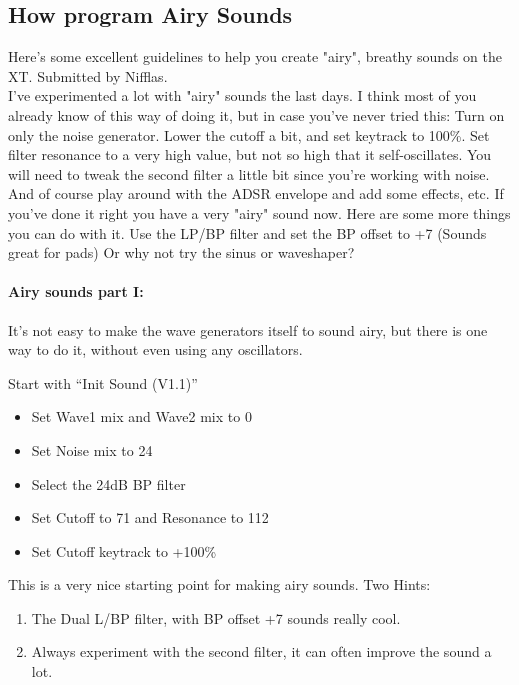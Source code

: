 \subsection{How program Airy Sounds}
Here's some excellent guidelines to help you create "airy", breathy sounds on the XT. Submitted by Nifflas.\\
I've experimented a lot with "airy" sounds the last days. I think most of you already know of this way of doing it, but in case you've never tried this:
Turn on only the noise generator. Lower the cutoff a bit, and set keytrack to 100\%. Set filter resonance to a very high value, but not so high that it self-oscillates. You will need to tweak the second filter a little bit since you're working with noise.
And of course play around with the ADSR envelope and add some effects, etc.
If you've done it right you have a very "airy" sound now. Here are some more things you can do with it.
Use the LP/BP filter and set the BP offset to +7 (Sounds great for pads) Or why not try the sinus or waveshaper?
\paragraph{Airy sounds part I:}
It's not easy to make the wave generators itself to sound airy, but there is one way to do it, without even using any oscillators.

Start with ``Init Sound (V1.1)''
\begin{itemize}
	\item Set Wave1 mix and Wave2 mix to 0
	\item Set Noise mix to 24
	\item Select the 24dB BP filter
	\item Set Cutoff to 71 and Resonance to 112
	\item Set Cutoff keytrack to +100\%
\end{itemize}
This is a very nice starting point for making airy sounds.
Two Hints:
\begin{enumerate}
	\item The Dual L/BP filter, with BP offset +7 sounds really cool.
	\item Always experiment with the second filter, it can often improve the sound a lot. 
\end{enumerate}
